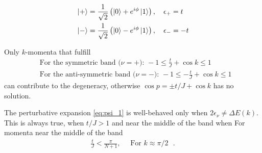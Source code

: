 \documentclass{article}
\begin{document}
\begin{tcolorbox}[title=Qubit eigenstates, colback=white, colframe=black]
\begin{align}
   & \ket{+} = \frac{1}{\sqrt{2}}\left( \ket{0} + e^{i\phi} \ket{1}\right), \quad \epsilon_+ = t \\
   & \ket{-} = \frac{1}{\sqrt{2}}\left( \ket{0} - e^{i\phi} \ket{1}\right), \quad \epsilon_- = -t
\end{align}
\end{tcolorbox}

\begin{tcolorbox}[title=Degeneracy Condition, colback=white, colframe=black]
Only $k$-momenta that fulfill
\begin{align}\label{eq:degen_condition}
    & \text{For the symmetric band ($\nu = +$): } -1 \leq \frac{t}{J} + \cos{k} \leq 1 \\
    & \text{For the anti-symmetric band ($\nu = -$): } -1 \leq -\frac{t}{J} + \cos{k} \leq 1
\end{align}
can contribute to the degeneracy, otherwise $\cos p= \pm t/J + \cos k$ has no solution.
\end{tcolorbox}

\begin{tcolorbox}[title=Band-Gap condition, colback=white, colframe=black]
    The perturbative expansion \eqref{eq:psi_1} is well-behaved only when $2\epsilon_\nu \neq \Delta E(k)$. This is always true, when $t/J>1$ and near the middle of the band when
    For momenta near the middle of the band
\begin{align}\label{eq:band_gap_condition}
    \frac{t}{J}<\frac{\pi}{N+1}, \quad \text{ For $k\approx\pi/2$ }.
\end{align}
\end{tcolorbox}
\end{document}
